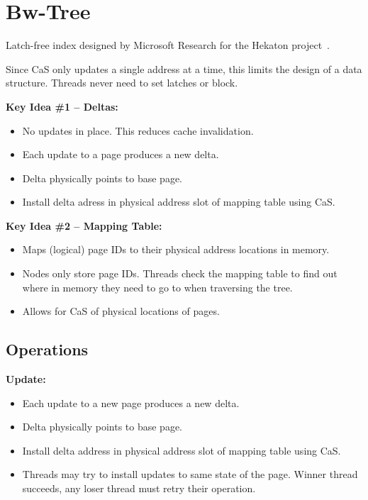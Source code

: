 \documentclass[11pt]{article}
\begin{document}
\section{Bw-Tree}
Latch-free index designed by Microsoft Research for the Hekaton project~\cite{bwtree-icde2013}.

Since CaS only updates a single address at a time, this limits the design of a data structure.
Threads never need to set latches or block.

\textbf{Key Idea \#1 -- Deltas:}
\begin{itemize}
    \item
    No updates in place. This reduces cache invalidation.
    
    \item
    Each update to a page produces a new delta.
    
    \item
    Delta physically points to base page.
    
    \item
    Install delta adress in physical address slot of mapping table using CaS.
\end{itemize}

\textbf{Key Idea \#2 -- Mapping Table:}
\begin{itemize}
    \item
    Maps (logical) page IDs to their physical address locations in memory.
    
    \item
    Nodes only store page IDs. Threads check the mapping table to find out where in memory 
    they need to go to when traversing the tree.

    \item
    Allows for CaS of physical locations of pages.
\end{itemize}

\subsection*{Operations}

\textbf{Update:}
\begin{itemize}
    \item
    Each update to a new page produces a new delta.
    
    \item
    Delta physically points to base page.
    
    \item
    Install delta address in physical address slot of mapping table using CaS.
    
    \item
    Threads may try to install updates to same state of the page.
    Winner thread succeeds, any loser thread must retry their operation.
\end{itemize}
\end{document}
